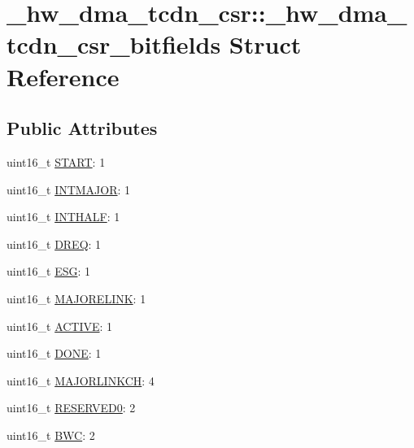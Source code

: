 \hypertarget{struct__hw__dma__tcdn__csr_1_1__hw__dma__tcdn__csr__bitfields}{}\section{\+\_\+hw\+\_\+dma\+\_\+tcdn\+\_\+csr\+:\+:\+\_\+hw\+\_\+dma\+\_\+tcdn\+\_\+csr\+\_\+bitfields Struct Reference}
\label{struct__hw__dma__tcdn__csr_1_1__hw__dma__tcdn__csr__bitfields}
\subsection*{Public Attributes}
\begin{DoxyCompactItemize}
\item 
uint16\+\_\+t \hyperlink{struct__hw__dma__tcdn__csr_1_1__hw__dma__tcdn__csr__bitfields_affdc2dc2e431b19f8a5e85303c57a82f}{S\+T\+A\+RT}\+: 1
\item 
uint16\+\_\+t \hyperlink{struct__hw__dma__tcdn__csr_1_1__hw__dma__tcdn__csr__bitfields_a589e321bc8e6675b798088e773fd5d50}{I\+N\+T\+M\+A\+J\+OR}\+: 1
\item 
uint16\+\_\+t \hyperlink{struct__hw__dma__tcdn__csr_1_1__hw__dma__tcdn__csr__bitfields_ad8ce6ecd4173e54b1bd5b8240068d017}{I\+N\+T\+H\+A\+LF}\+: 1
\item 
uint16\+\_\+t \hyperlink{struct__hw__dma__tcdn__csr_1_1__hw__dma__tcdn__csr__bitfields_ac1c27b19e4c8a26fabd60449b9a4c3e7}{D\+R\+EQ}\+: 1
\item 
uint16\+\_\+t \hyperlink{struct__hw__dma__tcdn__csr_1_1__hw__dma__tcdn__csr__bitfields_add7899e2d6d57beaf05027c8a625bb6f}{E\+SG}\+: 1
\item 
uint16\+\_\+t \hyperlink{struct__hw__dma__tcdn__csr_1_1__hw__dma__tcdn__csr__bitfields_a74d3cf4183df8ba18bde2ec55f781795}{M\+A\+J\+O\+R\+E\+L\+I\+NK}\+: 1
\item 
uint16\+\_\+t \hyperlink{struct__hw__dma__tcdn__csr_1_1__hw__dma__tcdn__csr__bitfields_aa0384a676347e53d1d67f42d2bd40517}{A\+C\+T\+I\+VE}\+: 1
\item 
uint16\+\_\+t \hyperlink{struct__hw__dma__tcdn__csr_1_1__hw__dma__tcdn__csr__bitfields_ad8d98bad560d4bda9bc08aba077c1a23}{D\+O\+NE}\+: 1
\item 
uint16\+\_\+t \hyperlink{struct__hw__dma__tcdn__csr_1_1__hw__dma__tcdn__csr__bitfields_a4392f6ed854e3c8e7d000de23f2c91fc}{M\+A\+J\+O\+R\+L\+I\+N\+K\+CH}\+: 4
\item 
uint16\+\_\+t \hyperlink{struct__hw__dma__tcdn__csr_1_1__hw__dma__tcdn__csr__bitfields_a98d51b49562f94f6e53aae75c5960307}{R\+E\+S\+E\+R\+V\+E\+D0}\+: 2
\item 
uint16\+\_\+t \hyperlink{struct__hw__dma__tcdn__csr_1_1__hw__dma__tcdn__csr__bitfields_ae2a504bfb11f02f54c47a54f3491607e}{B\+WC}\+: 2
\end{DoxyCompactItemize}



